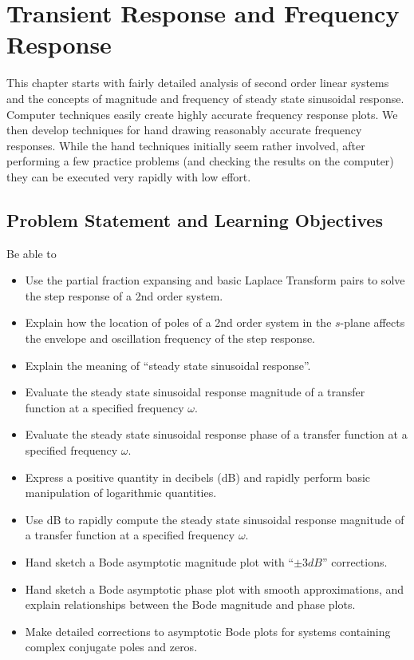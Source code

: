 %
%

\chapter{Transient Response and Frequency Response}\label{2ndOrderTransientChapter}

This chapter starts with fairly detailed analysis of second order linear systems and the concepts of magnitude and frequency of steady state sinusoidal response.  Computer techniques easily create highly accurate frequency response plots.   We then develop   techniques for hand drawing reasonably accurate frequency responses.   While the hand techniques initially seem rather involved, after performing a few practice problems (and checking the results on the computer) they can be executed very rapidly with low effort.

\section{Problem Statement and Learning Objectives}
Be able to
\begin{itemize}
    \item Use the partial fraction expansing and basic Laplace Transform pairs to
    solve the step response of a 2nd order system.
    \item Explain how the location of poles of a 2nd order system in the $s$-plane
    affects the envelope and oscillation frequency of the step response.
    \item Explain the meaning of ``steady state sinusoidal response''.
    \item Evaluate the steady state sinusoidal response magnitude of a transfer function
    at a specified frequency $\omega$.
    \item Evaluate the steady state sinusoidal response phase of a transfer function
    at a specified frequency $\omega$.
    \item Express a positive quantity in decibels (dB) and rapidly perform basic manipulation of
    logarithmic quantities.
    \item Use dB to rapidly compute  the steady state sinusoidal response magnitude of a transfer function
    at a specified frequency $\omega$.

    \item Hand sketch a Bode asymptotic magnitude plot with ``$\pm3dB$'' corrections.
    \item Hand sketch a Bode asymptotic phase plot with smooth approximations,
    and explain relationships between the Bode magnitude and phase plots.
    \item Make detailed corrections to asymptotic Bode plots for systems containing complex conjugate poles and zeros.

\end{itemize}



